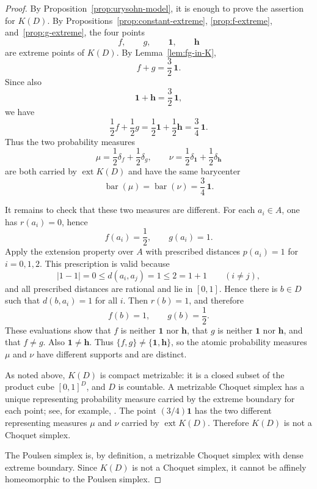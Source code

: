 \documentclass{proc-l}
\numberwithin{equation}{section}
\theoremstyle{definition}
\theoremstyle{remark}
\newcommand{\one}{\mathbf 1}
\newcommand{\half}{\mathbf h}
\newcommand{\ext}{\operatorname{ext}}
\newcommand{\bary}{\operatorname{bar}}
\begin{document}
\begin{proof}
By Proposition~\ref{prop:urysohn-model}, it is enough to prove the assertion for \(K(D)\).
By Propositions~\ref{prop:constant-extreme}, \ref{prop:f-extreme}, and~\ref{prop:g-extreme}, the four points
\[
        f,
        \qquad
        g,
        \qquad
        \one,
        \qquad
        \half
\]
are extreme points of \(K(D)\).  By Lemma~\ref{lem:fg-in-K},
\[
        f+g=\frac32\,\one.
\]
Since also
\[
        \one+\half=\frac32\,\one,
\]
we have
\[
        \frac12 f+\frac12 g
        =
        \frac12\one+\frac12\half
        =
        \frac34\,\one.
\]
Thus the two probability measures
\[
        \mu=\frac12\delta_f+\frac12\delta_g,
        \qquad
        \nu=\frac12\delta_{\one}+\frac12\delta_{\half}
\]
are both carried by \(\ext K(D)\) and have the same barycenter
\[
        \bary(\mu)=\bary(\nu)=\frac34\,\one.
\]

It remains to check that these two measures are different.  For each
\(a_i\in A\), one has \(r(a_i)=0\), hence
\[
        f(a_i)=\frac12,
        \qquad
        g(a_i)=1.
\]
Apply the extension property over \(A\) with prescribed distances
\(p(a_i)=1\) for \(i=0,1,2\).  This prescription is valid because
\[
        |1-1|=0\le d(a_i,a_j)=1\le2=1+1
        \qquad(i\ne j),
\]
and all prescribed distances are rational and lie in \([0,1]\).  Hence there
is \(b\in D\) such that \(d(b,a_i)=1\) for all \(i\).  Then \(r(b)=1\), and
therefore
\[
        f(b)=1,
        \qquad
        g(b)=\frac12.
\]
These evaluations show that \(f\) is neither \(\one\) nor \(\half\), that
\(g\) is neither \(\one\) nor \(\half\), and that \(f\ne g\).  Also
\(\one\ne\half\).  Thus \(\{f,g\}\ne\{\one,\half\}\), so the atomic probability
measures \(\mu\) and \(\nu\) have different supports and are distinct.

As noted above, \(K(D)\) is compact metrizable: it is a closed subset of the
product cube \([0,1]^D\), and \(D\) is countable.  A metrizable Choquet simplex
has a unique representing probability measure carried by the extreme boundary
for each point; see, for example, \cite{Phelps2001,Alfsen1971,AsimowEllis1980}.
The point \((3/4)\one\) has the two different representing measures \(\mu\) and
\(\nu\) carried by \(\ext K(D)\).  Therefore \(K(D)\) is not a Choquet simplex.

The Poulsen simplex is, by definition, a metrizable Choquet simplex with dense
extreme boundary.  Since \(K(D)\) is not a Choquet simplex, it cannot be
affinely homeomorphic to the Poulsen simplex.
\end{proof}
\end{document}
